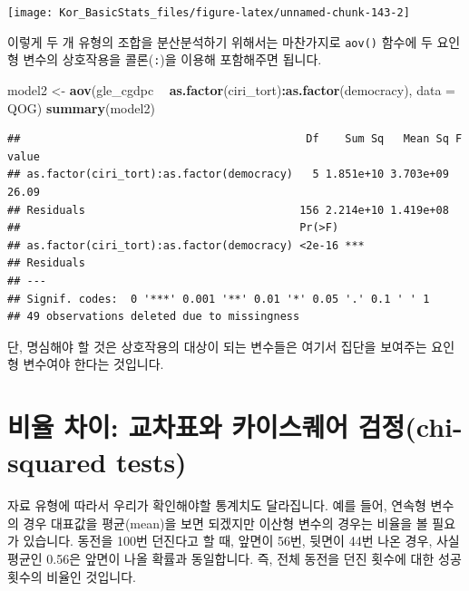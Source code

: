 \documentclass[]{book}
\newenvironment{Shaded}{\begin{snugshade}}{\end{snugshade}}
\newcommand{\DataTypeTok}[1]{\textcolor[rgb]{0.13,0.29,0.53}{#1}}
\newcommand{\KeywordTok}[1]{\textcolor[rgb]{0.13,0.29,0.53}{\textbf{#1}}}
\newcommand{\NormalTok}[1]{#1}
\newcommand{\OperatorTok}[1]{\textcolor[rgb]{0.81,0.36,0.00}{\textbf{#1}}}
\newcommand{\StringTok}[1]{\textcolor[rgb]{0.31,0.60,0.02}{#1}}
\begin{document}
\begin{center}\texttt{[image: Kor\_BasicStats\_files/figure-latex/unnamed-chunk-143-2]} \end{center}

이렇게 두 개 유형의 조합을 분산분석하기 위해서는 마찬가지로 \texttt{aov()} 함수에 두 요인형 변수의 상호작용을 콜론(\texttt{:})을 이용해 포함해주면 됩니다.

\begin{Shaded}
\begin{Highlighting}[]
\NormalTok{model2 <-}\StringTok{ }\KeywordTok{aov}\NormalTok{(gle_cgdpc }\OperatorTok{~}\StringTok{ }\KeywordTok{as.factor}\NormalTok{(ciri_tort)}\OperatorTok{:}\KeywordTok{as.factor}\NormalTok{(democracy), }\DataTypeTok{data =}\NormalTok{ QOG)}
\KeywordTok{summary}\NormalTok{(model2) }
\end{Highlighting}
\end{Shaded}

\begin{verbatim}
##                                            Df    Sum Sq   Mean Sq F value
## as.factor(ciri_tort):as.factor(democracy)   5 1.851e+10 3.703e+09   26.09
## Residuals                                 156 2.214e+10 1.419e+08        
##                                           Pr(>F)    
## as.factor(ciri_tort):as.factor(democracy) <2e-16 ***
## Residuals                                           
## ---
## Signif. codes:  0 '***' 0.001 '**' 0.01 '*' 0.05 '.' 0.1 ' ' 1
## 49 observations deleted due to missingness
\end{verbatim}

단, 명심해야 할 것은 상호작용의 대상이 되는 변수들은 여기서 집단을 보여주는 요인형 변수여야 한다는 것입니다.

\hypertarget{uxbe44uxc728-uxcc28uxc774-uxad50uxcc28uxd45cuxc640-uxce74uxc774uxc2a4uxd018uxc5b4-uxac80uxc815chi-squared-tests}{%
\section{비율 차이: 교차표와 카이스퀘어 검정(chi-squared tests)}\label{uxbe44uxc728-uxcc28uxc774-uxad50uxcc28uxd45cuxc640-uxce74uxc774uxc2a4uxd018uxc5b4-uxac80uxc815chi-squared-tests}}

자료 유형에 따라서 우리가 확인해야할 통계치도 달라집니다. 예를 들어, 연속형 변수의 경우 대표값을 평균(mean)을 보면 되겠지만 이산형 변수의 경우는 비율을 볼 필요가 있습니다. 동전을 100번 던진다고 할 때, 앞면이 56번, 뒷면이 44번 나온 경우, 사실 평균인 0.56은 앞면이 나올 확률과 동일합니다. 즉, 전체 동전을 던진 횟수에 대한 성공 횟수의 비율인 것입니다.
\end{document}

